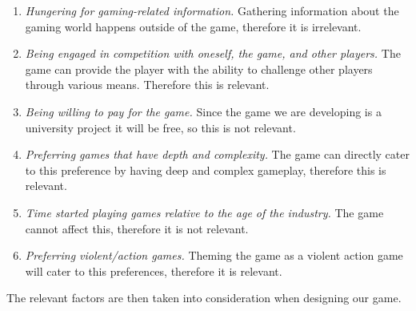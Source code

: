 \begin{enumerate}
\item \emph{Hungering for gaming-related information.}
Gathering information about the gaming world happens outside of the game, therefore it is irrelevant.

\item \emph{Being engaged in competition with oneself, the game, and other players.}
The game can provide the player with the ability to challenge other players through various means.
Therefore this is relevant.

\item \emph{Being willing to pay for the game.}
Since the game we are developing is a university project it will be free, so this is not relevant.

\item \emph{Preferring games that have depth and complexity.}
The game can directly cater to this preference by having deep and complex gameplay, therefore this is relevant.

\item \emph{Time started playing games relative to the age of the industry.}
The game cannot affect this, therefore it is not relevant.

\item \emph{Preferring violent/action games.}
Theming the game as a violent action game will cater to this preferences, therefore it is relevant.
\end{enumerate}

The relevant factors are then taken into consideration when designing our game.

